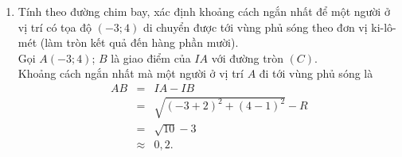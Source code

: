 \begin{bt}
{\begin{enumerate}
			Gọi $ M(-1;3) $. Ta có $ IM=\sqrt{(-1+2)^2+(3-1)^2}=\sqrt{5}<R=3 $.\\
			Vậy người dùng điện thoại sử dụng được dịch vụ của trạm.
			\item Tính theo đường chim bay, xác định khoảng cách ngắn nhất để một người ở vị trí có tọa độ $ (-3;4) $ di chuyển được tới vùng phủ sóng theo đơn vị ki-lô-mét (làm tròn kết quả đến hàng phần mười).\\
			Gọi $ A(-3;4) $; $ B $ là giao điểm của $ IA $ với đường tròn $ (C) $.\\
			Khoảng cách ngắn nhất mà một người ở vị trí $ A $ đi tới vùng phủ sóng là 
			\allowdisplaybreaks
			\begin{eqnarray*}
				AB&=&IA-IB \\
				&=&\sqrt{(-3+2)^2+(4-1)^2}-R\\
				&=&\sqrt{10}-3\\
				&\approx&0{,}2.
			\end{eqnarray*}
		\end{enumerate}	
	}
\end{bt}

